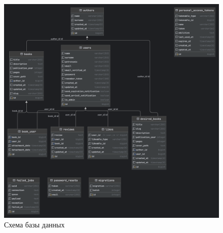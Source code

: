 \documentclass[project.tex]{subfiles}
\begin{document}
\begin{figure}[H]
   \label{pic}
   \includegraphics[width=\textwidth]{../../graphics/db-uml.png}
   \caption{Схема базы данных} 
\end{figure}
\end{document}
